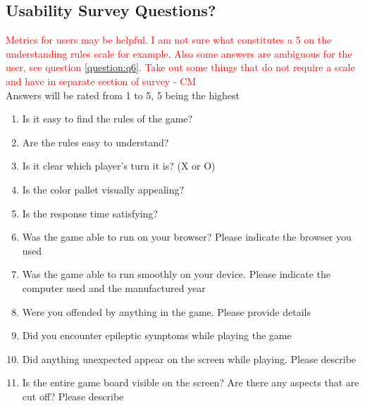 \documentclass[12pt, titlepage]{article}
\begin{document}
\subsection{Usability Survey Questions?}
\textcolor{red}{Metrics for users may be helpful. I am not sure what constitutes a 5 on the understanding rules scale for example. Also some answers are ambiguous for the user, see question \ref{question:q6}. Take out some things that do not require a scale and have in separate section of survey - CM} \\
Answers will be rated from 1 to 5, 5 being the highest
\begin{enumerate}
\item
Is it easy to find the rules of the game? \label{question:q1}
\item
Are the rules easy to understand? \label{question:q2}
\item
Is it clear which player's turn it is? (X or O) \label{question:q3}
\item
Is the color pallet visually appealing? \label{question:q4}
\item
Is the response time satisfying? \label{question:q5}
\item
Was the game able to run on your browser? Please indicate the browser you used
\label{question:q6}
\item
Was the game able to run smoothly on your device. Please indicate the computer
used and the manufactured year \label{question:q7}
\item
Were you offended by anything in the game. Please provide details \label{question:q8}
\item
Did you encounter epileptic symptoms while playing the game \label{question:q9}
\item
Did anything unexpected appear on the screen while playing. Please describe
\label{question:q10}
\item
Is the entire game board visible on the screen? Are there any aspects that are
cut off? Please describe \label{question:q11}


\end{enumerate}
\end{document}

